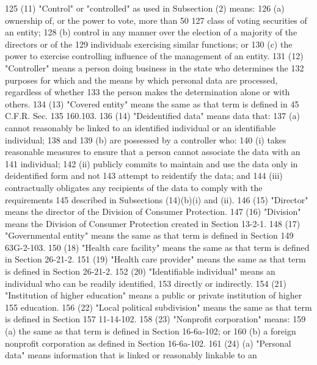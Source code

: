 125          (11) "Control" or "controlled" as used in Subsection (2) means:
126          (a) ownership of, or the power to vote, more than 50%
127     class of voting securities of an entity;
128          (b) control in any manner over the election of a majority of the directors or of the
129     individuals exercising similar functions; or
130          (c) the power to exercise controlling influence of the management of an entity.
131          (12) "Controller" means a person doing business in the state who determines the
132     purposes for which and the means by which personal data are processed, regardless of whether
133     the person makes the determination alone or with others.
134          (13) "Covered entity" means the same as that term is defined in 45 C.F.R. Sec.
135     160.103.
136          (14) "Deidentified data" means data that:
137          (a) cannot reasonably be linked to an identified individual or an identifiable individual;
138     and
139          (b) are possessed by a controller who:
140          (i) takes reasonable measures to ensure that a person cannot associate the data with an
141     individual;
142          (ii) publicly commits to maintain and use the data only in deidentified form and not
143     attempt to reidentify the data; and
144          (iii) contractually obligates any recipients of the data to comply with the requirements
145     described in Subsections (14)(b)(i) and (ii).
146          (15) "Director" means the director of the Division of Consumer Protection.
147          (16) "Division" means the Division of Consumer Protection created in Section 13-2-1.
148          (17) "Governmental entity" means the same as that term is defined in Section
149     63G-2-103.
150          (18) "Health care facility" means the same as that term is defined in Section 26-21-2.
151          (19) "Health care provider" means the same as that term is defined in Section 26-21-2.
152          (20) "Identifiable individual" means an individual who can be readily identified,
153     directly or indirectly.
154          (21) "Institution of higher education" means a public or private institution of higher
155     education.
156          (22) "Local political subdivision" means the same as that term is defined in Section
157     11-14-102.
158          (23) "Nonprofit corporation" means:
159          (a) the same as that term is defined in Section 16-6a-102; or
160          (b) a foreign nonprofit corporation as defined in Section 16-6a-102.
161          (24) (a) "Personal data" means information that is linked or reasonably linkable to an
